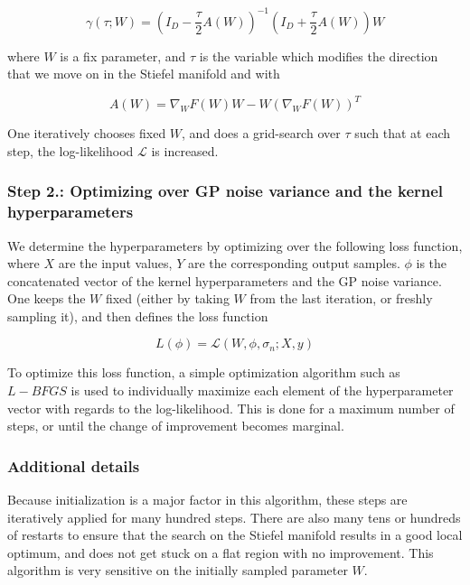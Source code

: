 \begin{equation}
\gamma(\tau; W) = (I_D - \frac{\tau}{2} A(W) )^{-1} (I_D + \frac{\tau}{2} A(W) ) W
\end{equation}


where $W$ is a fix parameter, and $\tau$ is the variable which modifies the direction that we move on in the Stiefel manifold and with

\begin{equation}
A(W) = \nabla_{W} F(W) W - W ( \nabla_{W} F(W) )^T
\end{equation}

One iteratively chooses fixed $W$, and does a grid-search over $\tau$ such that at each step, the log-likelihood $\mathcal{L}$ is increased.

\subsubsection{Step 2.: Optimizing over GP noise variance and the kernel hyperparameters}

We determine the hyperparameters by optimizing over the following loss function, where $X$ are the input values, $Y$ are the corresponding output samples. $\phi$ is the concatenated vector of the kernel hyperparameters and the GP noise variance. \\

One keeps the $W$ fixed (either by taking $W$ from the last iteration, or freshly sampling it), and then defines the loss function

\begin{equation}
	L(\phi) = \mathcal{L}(W, \phi, \sigma_n; X, y) 
\end{equation}

To optimize this loss function, a simple optimization algorithm such as $L-BFGS$ is used to individually maximize each element of the hyperparameter vector with regards to the log-likelihood.
This is done for a maximum number of steps, or until the change of improvement becomes marginal. \\

\subsubsection{Additional details}
Because initialization is a major factor in this algorithm, these steps are iteratively applied for many hundred steps.
There are also many tens or hundreds of restarts to ensure that the search on the Stiefel manifold results in a good local optimum, and does not get stuck on a flat region with no improvement.
This algorithm is very sensitive on the initially sampled parameter $W$.

